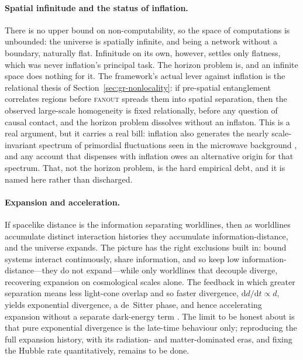 \paragraph{Spatial infinitude and the status of inflation.}
There is no upper bound on non-computability, so the space of computations is
unbounded: the universe is spatially infinite, and being a network without a
boundary, naturally flat. Infinitude on its own, however, settles only flatness,
which was never inflation's principal task. The horizon problem is, and an
infinite space does nothing for it. The framework's actual lever against
inflation is the relational thesis of Section~\ref{sec:gr-nonlocality}: if
pre-spatial entanglement correlates regions before \textsc{fanout} spreads them
into spatial separation, then the observed large-scale homogeneity is fixed
relationally, before any question of causal contact, and the horizon problem
dissolves without an inflaton. This is a real argument, but it carries a real
bill: inflation also generates the nearly scale-invariant spectrum of primordial
fluctuations seen in the microwave background \autocite{Planck2020}, and any
account that dispenses with inflation owes an alternative origin for that
spectrum. That, not the horizon problem, is the hard empirical debt, and it is
named here rather than discharged.

\paragraph{Expansion and acceleration.}
If spacelike distance is the information separating worldlines, then as worldlines
accumulate distinct interaction histories they accumulate information-distance,
and the universe expands. The picture has the right exclusions built in: bound
systems interact continuously, share information, and so keep low
information-distance---they do not expand---while only worldlines that decouple
diverge, recovering expansion on cosmological scales alone. The feedback in which
greater separation means less light-cone overlap and so faster divergence,
$\mathrm{d}d/\mathrm{d}t \propto d$, yields exponential divergence, a de~Sitter
phase, and hence accelerating expansion without a separate dark-energy term
\autocite{Riess1998}. The limit to be honest about is that pure exponential
divergence is the late-time behaviour only; reproducing the full expansion history,
with its radiation- and matter-dominated eras, and fixing the Hubble rate
quantitatively, remains to be done.

